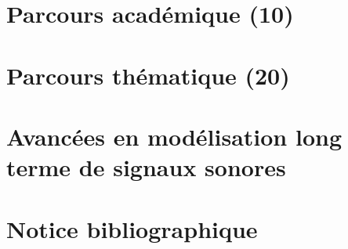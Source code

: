 \documentclass[a4paper, french, 10pt]{tufte-book}
\begin{document}
  \chapter{Parcours académique (10)}

  

  \chapter{Parcours thématique (20)}

  

  \chapter{Avancées en modélisation long terme de signaux sonores}

  

  \chapter{Notice bibliographique}

  

  
\end{document}

